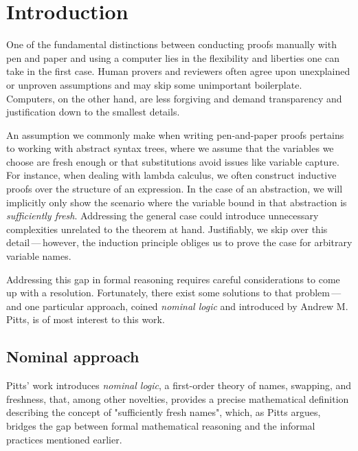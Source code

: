 \documentclass[english, mgr]{iithesis}
\author         {Dominik Gulczyński}
\date           {\today}                     %
\renewcommand{\it}[1]{\textit{#1}}
\newcommand{\mdash}{\,---\,}
\def\-{{\mdash}}
\begin{document}
\chapter{Introduction}
One of the fundamental distinctions between conducting proofs manually with pen and paper
and using a computer lies in the flexibility and liberties one can take in the first case.
Human provers and reviewers often agree upon unexplained or unproven assumptions
and may skip some unimportant boilerplate.
Computers, on the other hand, are less forgiving
and demand transparency and justification down to the smallest details.

An assumption we commonly make when writing pen-and-paper proofs pertains to
working with abstract syntax trees,
where we assume that the variables we choose are fresh enough
or that substitutions avoid issues like variable capture.
For instance, when dealing with lambda calculus, we often construct inductive proofs
over the structure of an expression. In the case of an abstraction, we will implicitly only show
the scenario where the variable bound in that abstraction is \it{sufficiently fresh}.
Addressing the general case could introduce unnecessary complexities unrelated to the theorem at hand.
Justifiably, we skip over this detail\-however, the induction principle obliges us to prove the case for arbitrary variable names.

Addressing this gap in formal reasoning requires careful considerations to come up with a resolution.
Fortunately, there exist some solutions to that problem\-and one particular
approach, coined \it{nominal logic} and introduced by Andrew M. Pitts\cite{nominal-logic}, is of most interest to this work.


\section{Nominal approach}
Pitts' work introduces \it{nominal logic}, a first-order theory of names, swapping, and freshness,
that, among other novelties, provides a precise mathematical definition
describing the concept of "sufficiently fresh names",
which, as Pitts argues, bridges the gap between formal mathematical reasoning and the informal practices mentioned earlier.
\end{document}
